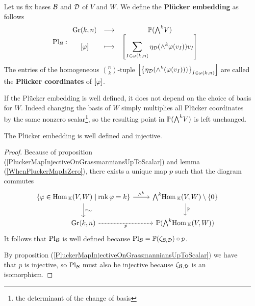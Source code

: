 \begin{definition}
Let us fix bases $\mathcal{B}$ and $\mathcal{D}$ of $V$ and $W$. We define the \textbf{Pl\"ucker embedding} as follows
\[\Pl_\Bc:\funcDef{\Gr(k,n)}{\Pj(\bw V)}{[\vp]}{\displaystyle\spa{\sum_{I\in \omega(k,n)} \eta_\Dc(\wedge^k\vp(v_I))v_I}}\]
The entries of the homogeneous $\binom nk$-tuple $\left[{\left\{{\eta_{\mathcal{D}}(\wedge^k(\varphi(v_I)))}\right\}_{I\in\omega(k,n)}}\right]$ are called the \textbf{Pl\"ucker coordinates} of $[\varphi]$. 
\end{definition}
\begin{remark}
If the Pl\"ucker embedding is well defined, it does not depend on the choice of basis for $W$. Indeed changing the basis of $W$ simply multiplies all Pl\"ucker coordinates by the same nonzero scalar\footnote{the determinant of the change of basis}, so the resulting point in $\Pj(\bw V)$ is left unchanged.
\end{remark}

\begin{proposition}\label{PluckerEmbeddingWellDefinedInjective}
The Pl\"ucker embedding is well defined and injective.
\end{proposition}
\begin{proof}
Because of proposition (\ref{PluckerMapInjectiveOnGrassmanniansUpToScalar}) and lemma (\ref{WhenPluckerMapIsZero}), there exists a unique map $p$ such that the diagram commutes
\[\begin{tikzcd}
	{\cpa{\vp\in \Hom_\K(V,W)\mid \rnk \vp=k}} & {\bw \Hom_\K(V,W)\nz} \\
	{\Gr(k,n)} & {\Pj(\bw \Hom_\K(V,W))}
	\arrow["{\wedge^k}", from=1-1, to=1-2]
	\arrow["{\pi_\sim}", from=1-1, to=2-1]
	\arrow["\Pj", from=1-2, to=2-2]
	\arrow["p"', dashed, from=2-1, to=2-2]
\end{tikzcd}\]
It follows that $\mathrm{Pl}_{\mathcal{B}}$ is well defined because $\mathrm{Pl}_{\mathcal{B}}=\mathbb{P}(\zeta_{\mathcal{B},\mathcal{D}})\circ p$.

By proposition (\ref{PluckerMapInjectiveOnGrassmanniansUpToScalar}) we have that $p$ is injective, so $\mathrm{Pl}_{\mathcal{B}}$ must also be injective because $\zeta_{\mathcal{B},\mathcal{D}}$ is an isomorphism.
\end{proof}


